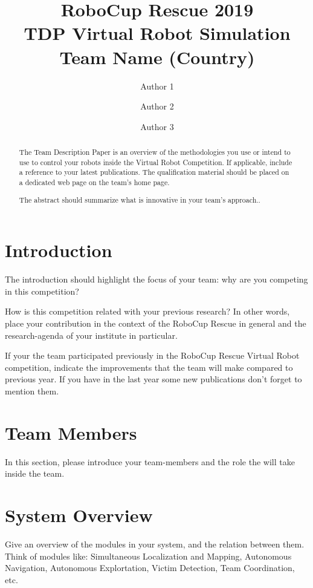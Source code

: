 \documentclass[runningheads,a4paper]{llncs}
\begin{document}
\title{RoboCup Rescue 2019\\
       TDP Virtual Robot Simulation\\
       Team Name (Country)}
\author{Author 1 \and Author 2 \and Author 3}
\maketitle
\begin{abstract}
The Team Description Paper is an overview of the methodologies you use or intend to use to control your robots inside the Virtual Robot Competition. If applicable, include a reference to your latest publications. The qualification material should be placed on a dedicated web page on the team's home page.

The abstract should summarize what is innovative in your team's approach..
\end{abstract}
\section{Introduction}
The introduction should highlight the focus of your team: why are you competing in this competition?

How is this competition related with your previous research? In other words, place your contribution in the context of the RoboCup Rescue in general and the research-agenda of your institute in particular.

If your the team participated previously in the RoboCup Rescue Virtual Robot competition, indicate the improvements that the team will make compared to previous year. If you have in the last year some new publications don't forget to mention them.
\section{Team Members}
In this section, please introduce your team-members and the role the will take inside the team.
\section{System Overview}
Give an overview of the modules in your system, and the relation between them. Think of modules like: Simultaneous Localization and Mapping, Autonomous Navigation, Autonomous Explortation, Victim Detection, Team Coordination, etc.
\end{document}
